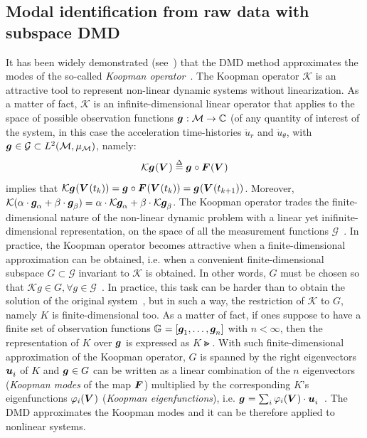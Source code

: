 \documentclass[runningheads]{llncs}
\begin{document}
\subsection{Modal identification from raw data with subspace DMD}
\label{subsec:Modal_identification_from_raw_data_with_subspace_DMD}


It has been widely demonstrated (see~\cite{Rowley_et_al_2009,Schmid_2010,Mezic_2013,kutz_multiresolution_2016}) that the DMD method approximates the modes of the so-called \textit{Koopman operator}~\cite{Koopman_1931}. The Koopman operator $\mathcal{K}$ is an attractive tool to represent non-linear dynamic systems without linearization. As a matter of fact, $\mathcal{K}$ is an infinite-dimensional linear operator that applies to the space of possible observation functions $\gv:\mathcal{M}\to\mathbb{C}$ (of any quantity of interest of the system, in this case the acceleration time-histories $\ddot{u}_r$ and $\ddot{u}_\theta$, with $\gv\in\mathcal{G}\subset L^{2}(\mathcal{M},\mu_\mathcal{M})$, namely:
\begin{equation}
    \mathcal{K}\gv(\Vv) \overset{\Delta}{=} \gv\circ \Fv(\Vv)
    \label{eq:Koopman_operator}
\end{equation}
 implies that $\mathcal{K}\gv(\Vv(t_k)) = \gv\circ \Fv(\Vv(t_k))=\gv(\Vv(t_{k+1}))$. Moreover, $\mathcal{K}(\alpha\cdot \gv[\alpha]+\beta \cdot \gv[\beta])=\alpha\cdot\mathcal{K} \gv[\alpha]+\beta\cdot\mathcal{K}\gv[\beta]$. The Koopman operator trades the finite-dimensional nature of the non-linear dynamic problem with a linear yet inifinite-dimensional representation, on the space of all the measurement functions $\mathcal{G}$~\cite{brunton_chaos_2017}. In practice, the Koopman operator becomes attractive when a finite-dimensional approximation can be obtained, i.e. when a convenient finite-dimensional subspace $G\subset\mathcal{G}$ invariant to $\mathcal{K}$ is obtained. In other words, $G$ must be chosen so that $\mathcal{K}g\in G, \forall g\in \mathcal{G}$~\cite{takeishi_subspace_2017}. In practice, this task can be harder than to obtain the solution of the original system~\cite{brunton_chaos_2017}, but in such a way, the restriction of $\mathcal{K}$ to $G$, namely $K$ is finite-dimensional too. As a matter of fact, if ones suppose to have a finite set of observation functions $\Gt=\psp{\gv[1], \ldots, \gv[n]}$ with $n<\infty$, then the representation of $K$ over $\gv$ is expressed as $K\Gt$. With such finite-dimensional approximation of the Koopman operator, $G$ is spanned by the right eigenvectors $\uv[i]$ of $K$ and $\gv\in G$ can be written as a linear combination of the $n$ eigenvectors (\textit{Koopman modes} of the map $\Fv$) multiplied by the corresponding $K$'s eigenfunctions $\varphi_i(\Vv)$ (\textit{Koopman eigenfunctions}), i.e.  $\gv=\sum_i \varphi_i(\Vv)\cdot \uv[i]$~\cite{Rowley_et_al_2009}. The DMD approximates the Koopman modes and it can be therefore applied to nonlinear systems. 
\end{document}
